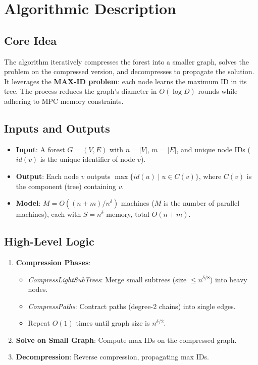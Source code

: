 \documentclass[11pt]{article}
\begin{document}
\section{Algorithmic Description}

\subsection{Core Idea}
The algorithm iteratively compresses the forest into a smaller graph, solves the problem on the compressed version, and decompresses to propagate the solution. It leverages the \textbf{MAX-ID problem}: each node learns the maximum ID in its tree. The process reduces the graph’s diameter in \(O(\log D)\) rounds while adhering to MPC memory constraints.

\subsection{Inputs and Outputs}
\begin{itemize}
    \item \textbf{Input}: A forest \(G = (V, E)\) with \(n = |V|\), \(m = |E|\), and unique node IDs (\(id(v)\) is the unique identifier of node \(v\)).
    \item \textbf{Output}: Each node \(v\) outputs \(\max\{id(u) \mid u \in C(v)\}\), where \(C(v)\) is the component (tree) containing \(v\).
    \item \textbf{Model}: \(M = O((n + m) / n^\delta)\) machines (\(M\) is the number of parallel machines), each with \(S = n^\delta\) memory, total \(O(n + m)\).
\end{itemize}

\subsection{High-Level Logic}
\begin{enumerate}
    \item \textbf{Compression Phases}:
        \begin{itemize}
            \item \textit{CompressLightSubTrees}: Merge small subtrees (size \(\leq n^{\delta / 8}\)) into heavy nodes.
            \item \textit{CompressPaths}: Contract paths (degree-2 chains) into single edges.
            \item Repeat \(O(1)\) times until graph size is \(n^{\delta / 2}\).
        \end{itemize}
    \item \textbf{Solve on Small Graph}: Compute max IDs on the compressed graph.
    \item \textbf{Decompression}: Reverse compression, propagating max IDs.
\end{enumerate}
\end{document}
